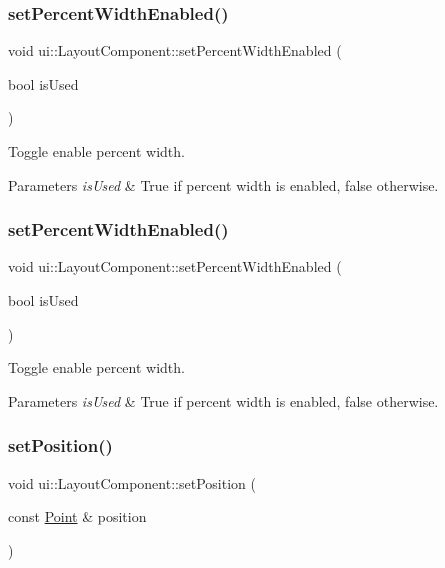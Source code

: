 \subsubsection{\texorpdfstring{set\+Percent\+Width\+Enabled()}{setPercentWidthEnabled()}\hspace{0.1cm}{\footnotesize\ttfamily [1/2]}}
{\footnotesize\ttfamily void ui\+::\+Layout\+Component\+::set\+Percent\+Width\+Enabled (\begin{DoxyParamCaption}\item[{bool}]{is\+Used }\end{DoxyParamCaption})}

Toggle enable percent width. 
\begin{DoxyParams}{Parameters}
{\em is\+Used} & True if percent width is enabled, false otherwise. \\
\hline
\end{DoxyParams}
\mbox{\label{classui_1_1LayoutComponent_a225d5d4a20568a3a4a4b2f53732bdab4}} 
\subsubsection{\texorpdfstring{set\+Percent\+Width\+Enabled()}{setPercentWidthEnabled()}\hspace{0.1cm}{\footnotesize\ttfamily [2/2]}}
{\footnotesize\ttfamily void ui\+::\+Layout\+Component\+::set\+Percent\+Width\+Enabled (\begin{DoxyParamCaption}\item[{bool}]{is\+Used }\end{DoxyParamCaption})}

Toggle enable percent width. 
\begin{DoxyParams}{Parameters}
{\em is\+Used} & True if percent width is enabled, false otherwise. \\
\hline
\end{DoxyParams}
\mbox{\label{classui_1_1LayoutComponent_ac965de551371d6087f29d3bcfccb11d9}} 
\subsubsection{\texorpdfstring{set\+Position()}{setPosition()}\hspace{0.1cm}{\footnotesize\ttfamily [1/2]}}
{\footnotesize\ttfamily void ui\+::\+Layout\+Component\+::set\+Position (\begin{DoxyParamCaption}\item[{const \hyperlink{classVec2}{Point} \&}]{position }\end{DoxyParamCaption})}

